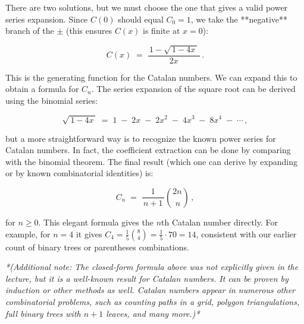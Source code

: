 \documentclass[docmute]{article}
\begin{document}
There are two solutions, but we must choose the one that gives a valid power series expansion. Since $C(0)$ should equal $C_0 = 1$, we take the **negative** branch of the $\pm$ (this ensures $C(x)$ is finite at $x=0$):

\[
C(x) \;=\; \frac{\,1 - \sqrt{\,1 - 4x\,}\,}{2x}\,.
\]

This is the generating function for the Catalan numbers. We can expand this to obtain a formula for $C_n$. The series expansion of the square root can be derived using the binomial series:

\[
\sqrt{\,1 - 4x\,} \;=\; 1 \;-\; 2x \;-\; 2x^2 \;-\; 4x^3 \;-\; 8x^4 \;-\; \cdots\,,
\] 

but a more straightforward way is to recognize the known power series for Catalan numbers. In fact, the coefficient extraction can be done by comparing with the binomial theorem. The final result (which one can derive by expanding or by known combinatorial identities) is:

\[
C_n \;=\; \frac{1}{\,n+1\,}\binom{2n}{\,n}\,,
\] 

for $n \ge 0$. This elegant formula gives the $n$th Catalan number directly. For example, for $n=4$ it gives $C_4 = \frac{1}{5}\binom{8}{4} = \frac{1}{5}\cdot 70 = 14$, consistent with our earlier count of binary trees or parentheses combinations.

\textit{*(Additional note: The closed-form formula above was not explicitly given in the lecture, but it is a well-known result for Catalan numbers. It can be proven by induction or other methods as well. Catalan numbers appear in numerous other combinatorial problems, such as counting paths in a grid, polygon triangulations, full binary trees with $n+1$ leaves, and many more.)*}
\end{document}

